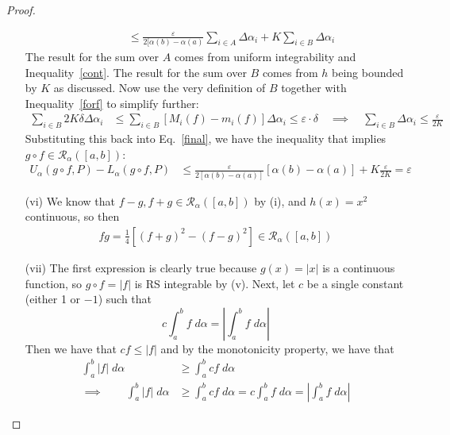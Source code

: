 \documentclass[12pt]{article}
\numberwithin{equation}{section} %
\theoremstyle{plain}
\theoremstyle{definition}
\theoremstyle{remark}
\begin{document}
\begin{proof}
\begin{enumerate}[label=(\roman*)]
\begin{align}
        \qquad
        &\leq \frac{\varepsilon}{2[\alpha(b)-\alpha(a)}
            \sum_{i\in A} \Delta\alpha_i+
            K \sum_{i\in B} \Delta\alpha_i
            \label{final}
    \end{align}
    The result for the sum over $A$ comes from uniform integrability and
    Inequality~\ref{cont}. The result for the sum over $B$ comes from
    $h$ being bounded by $K$ as discussed.
    Now use the very definition of $B$ together with
    Inequality~\ref{forf} to simplify further:
    \begin{align*}
        \sum_{i\in B}
        {2K}{\delta} \Delta\alpha_i &\leq
        \sum_{i\in B} \left[M_i(f) - m_i(f) \right]
        \Delta\alpha_i \leq \varepsilon\cdot\delta
        \quad\implies\quad
        \sum_{i\in B} \Delta\alpha_i
        \leq \frac{\varepsilon}{2K}
    \end{align*}
    Substituting this back into Eq.~\ref{final}, we have the
    inequality that implies $g\circ f\in\mathscr{R}_\alpha([a,b])$:
    \begin{align*}
        U_\alpha(g\circ f,P) - L_\alpha(g\circ f,P)
        &\leq \frac{\varepsilon}{2[\alpha(b)-\alpha(a)]}
            [\alpha(b)-\alpha(a)]
            + K\frac{\varepsilon}{2K}
            = \varepsilon
    \end{align*}

  \item[(vi)]
    We know that $f - g,f+g \in \mathscr{R}_\alpha([a,b])$
    by (i), and $h(x) = x^2$ continuous, so then
    \begin{align*}
      fg = \frac{1}{4} \left[(f+g)^2 - (f-g)^2 \right]
      \in\mathscr{R}_\alpha([a,b])
    \end{align*}

  \item[(vii)]
    The first expression is clearly true because $g(x)=|x|$
    is a continuous function, so $g\circ f = |f|$ is
    RS integrable by (v).
    Next, let $c$ be a single constant (either 1 or
    $-1$) such that
        \[ c\int^b_a f\; d\alpha = \left\lvert
        \int^b_a f\;d\alpha \right\rvert \]
    Then we have that $cf \leq |f|$ and by the monotonicity
    property, we have that
    \begin{align*}
        \int^b_a |f| \; d\alpha &\geq
            \int^b_a cf \; d\alpha \\
        \implies \qquad
        \int^b_a |f| \; d\alpha &\geq
            \int^b_a cf \; d\alpha =
            c \int^b_a f \; d\alpha =
            \left\lvert
            \int^b_a f \; d\alpha \right\rvert
    \end{align*}
\end{enumerate}
\end{proof}
\end{document}
